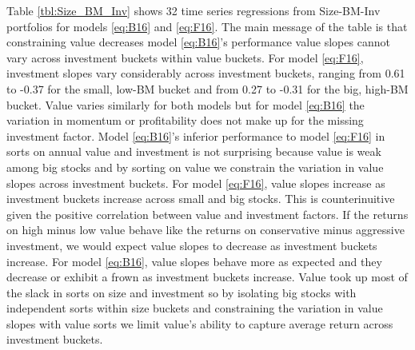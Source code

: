
Table \ref{tbl:Size_BM_Inv} shows 32 time series regressions from Size-BM-Inv
portfolios for models \ref{eq:B16} and \ref{eq:F16}.
The main message of the table is that constraining value decreases
model \ref{eq:B16}'s performance value slopes cannot vary across investment
buckets within value buckets.
For model \ref{eq:F16}, investment slopes vary considerably across
investment buckets, ranging from 0.61 to -0.37 for the small, low-BM bucket
and from 0.27 to -0.31 for the big, high-BM bucket.
Value varies similarly for both models but for model \ref{eq:B16} the variation
in momentum or profitability does not make up for the missing investment
factor.
Model \ref{eq:B16}'s inferior performance to model \ref{eq:F16} in sorts on
annual value and investment is not surprising because value is weak among
big stocks \parencite{asness2015fact}
and by sorting on value we constrain the variation in value slopes
across investment buckets.
For model \ref{eq:F16}, value slopes increase as investment buckets increase
across small and big stocks.
This is counterinuitive given the positive correlation between value and
investment factors.
If the returns on high minus low value behave like the returns on conservative
minus aggressive investment, we would expect value slopes to decrease as
investment buckets increase.
For model \ref{eq:B16}, value slopes behave more as expected and they decrease
or exhibit a frown as investment buckets increase.
Value took up most of the slack in sorts on size and investment so by
isolating big stocks with independent sorts within size buckets and
constraining the variation in
value slopes with value sorts we limit value's ability to capture average
return across investment buckets.

